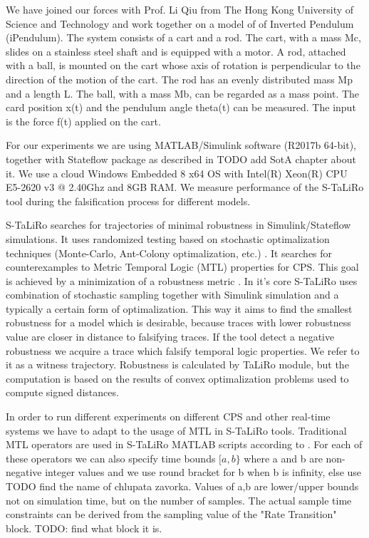 We have joined our forces with Prof. Li Qiu from The Hong Kong University of Science and Technology and work together on a model of of Inverted Pendulum (iPendulum). The system consists of a cart and a rod. The cart, with a mass Mc, slides on a stainless steel shaft and is equipped with a motor. A rod, attached with a ball, is mounted on the cart whose axis of rotation is perpendicular to the direction of the motion of the cart. The rod has an evenly distributed mass Mp and a length L. The ball, with a mass Mb, can be regarded as a mass point. The card position x(t) and the pendulum angle theta(t) can be measured. The input is the force f(t) applied on the cart.

For our experiments we are using MATLAB/Simulink software (R2017b 64-bit), together with Stateflow package as described in {TODO add SotA chapter about it}. We use a cloud Windows Embedded 8 x64 OS with Intel(R) Xeon(R) CPU E5-2620 v3 @ 2.40Ghz and 8GB RAM. We measure performance of the S-TaLiRo tool during the falsification process for different models.

S-TaLiRo searches for trajectories of minimal robustness in Simulink/Stateflow simulations. It uses randomized testing based on stochastic optimalization techniques (Monte-Carlo, Ant-Colony optimalization, etc.) \cite{Fainekos:AntColonies}. It searches for counterexamples to Metric Temporal Logic (MTL) properties for CPS. This goal is achieved by a minimization of a robustness metric \cite{Fainekos:RobustnessContinuousTime}. In it's core S-TaLiRo uses combination of stochastic sampling together with Simulink simulation and a typically a certain form of optimalization. This way it aims to find the smallest robustness for a model which is desirable, because traces with lower robustness value are closer in distance to falsifying traces. If the tool detect a negative robustness we acquire a trace which falsify temporal logic properties. We refer to it as a witness trajectory. Robustness is calculated by TaLiRo module, but the computation is based on the results of convex optimalization problems used to compute signed distances.

In order to run different experiments on different CPS and other real-time systems we have to adapt to the usage of MTL in S-TaLiRo tools. Traditional MTL operators are used in S-TaLiRo MATLAB scripts according to . For each of these operators we can also specify time bounds $[a,b\}$ where a and b are non-negative integer values and we use round bracket for b when b is infinity, else use TODO find the name of chlupata zavorka. Values of a,b are lower/upper bounds not on simulation time, but on the number of samples. The actual sample time constraints can be derived from the sampling value of the "Rate Transition" block. TODO: find what block it is.

